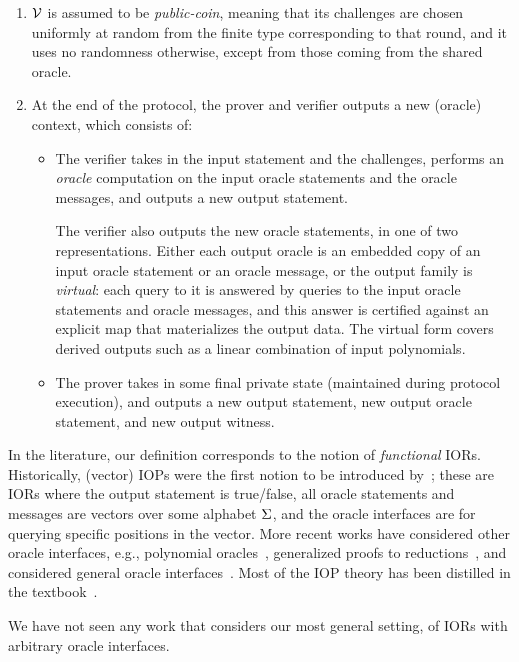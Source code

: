 \begin{enumerate}
    \item \(\mathcal{V}\) is assumed to be \emph{public-coin}, meaning that its challenges are chosen
    uniformly at random from the finite type corresponding to that round, and it uses no randomness
    otherwise, except from those coming from the shared oracle.

    \item At the end of the protocol, the prover and verifier outputs a new (oracle) context, which consists of:
    \begin{itemize}
        \item The verifier takes in the input statement and the challenges, performs an \emph{oracle} computation on the input oracle statements and the oracle messages, and outputs a new output statement.

        The verifier also outputs the new oracle statements, in one of two representations. Either
        each output oracle is an embedded copy of an input oracle statement or an oracle message,
        or the output family is \emph{virtual}: each query to it is answered by queries to the
        input oracle statements and oracle messages, and this answer is certified against an
        explicit map that materializes the output data. The virtual form covers derived outputs
        such as a linear combination of input polynomials.
        \item The prover takes in some final private state (maintained during protocol execution), and outputs a new output statement, new output oracle statement, and new output witness.
    \end{itemize}
\end{enumerate}

\begin{remark}
In the literature, our definition corresponds to the notion of \emph{functional} IORs. Historically,
(vector) IOPs were the first notion to be introduced by~\cite{IOPs}; these are IORs where the output
statement is true/false, all oracle statements and messages are vectors over some alphabet \(\Sigma\),
and the oracle interfaces are for querying specific positions in the vector. More recent works have
considered other oracle interfaces, e.g., polynomial oracles~\cite{Marlin, DARK}, generalized proofs
to reductions~\cite{ARoK, WARP, Arc, fics-facs}, and considered general oracle
interfaces~\cite{WHIR}. Most of the IOP theory has been distilled in the
textbook~\cite{ChiesaYogev2024}.

We have not seen any work that considers our most general setting, of IORs with arbitrary oracle interfaces.
\end{remark}

